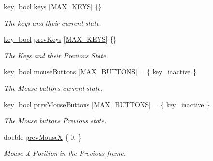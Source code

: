 \begin{DoxyCompactItemize}
\item 
\mbox{\hyperlink{_window_8h_a793ae82d7efec9490f81b4595e03b6f2}{key\+\_\+bool}} \mbox{\hyperlink{class_window_a7e9389c2d0e9f90f10422f86be7d22d8}{keys}} \mbox{[}\mbox{\hyperlink{_window_8h_a3077ecca3770bdee50e6a17dfb55d002}{M\+A\+X\+\_\+\+K\+E\+YS}}\mbox{]} \{\}
\begin{DoxyCompactList}\small\item\em The keys and their current state. \end{DoxyCompactList}\item 
\mbox{\hyperlink{_window_8h_a793ae82d7efec9490f81b4595e03b6f2}{key\+\_\+bool}} \mbox{\hyperlink{class_window_aa0adc9c4e183ccaa355928059359fe9a}{prev\+Keys}} \mbox{[}\mbox{\hyperlink{_window_8h_a3077ecca3770bdee50e6a17dfb55d002}{M\+A\+X\+\_\+\+K\+E\+YS}}\mbox{]} \{\}
\begin{DoxyCompactList}\small\item\em The Keys and their Previous State. \end{DoxyCompactList}\item 
\mbox{\hyperlink{_window_8h_a793ae82d7efec9490f81b4595e03b6f2}{key\+\_\+bool}} \mbox{\hyperlink{class_window_af219ad727d87f6f2d0d34c0d165ec065}{mouse\+Buttons}} \mbox{[}\mbox{\hyperlink{_window_8h_a8bb0c7f312bb8665c3377a061dae552c}{M\+A\+X\+\_\+\+B\+U\+T\+T\+O\+NS}}\mbox{]} = \{ \mbox{\hyperlink{_window_8h_a793ae82d7efec9490f81b4595e03b6f2ab04ef1a66cda34ead7b763a49080d854}{key\+\_\+inactive}} \}
\begin{DoxyCompactList}\small\item\em The Mouse buttons current state. \end{DoxyCompactList}\item 
\mbox{\hyperlink{_window_8h_a793ae82d7efec9490f81b4595e03b6f2}{key\+\_\+bool}} \mbox{\hyperlink{class_window_a89e8b6c9ffa84a095ec76cf1b29b5f94}{prev\+Mouse\+Buttons}} \mbox{[}\mbox{\hyperlink{_window_8h_a8bb0c7f312bb8665c3377a061dae552c}{M\+A\+X\+\_\+\+B\+U\+T\+T\+O\+NS}}\mbox{]} = \{ \mbox{\hyperlink{_window_8h_a793ae82d7efec9490f81b4595e03b6f2ab04ef1a66cda34ead7b763a49080d854}{key\+\_\+inactive}} \}
\begin{DoxyCompactList}\small\item\em The Mouse buttons Previous state. \end{DoxyCompactList}\item 
double \mbox{\hyperlink{class_window_ad50401a5c3c350b562b9577106e60fb0}{prev\+MouseX}} \{ 0. \}
\begin{DoxyCompactList}\small\item\em Mouse X Position in the Previous frame. \end{DoxyCompactList}\item 

\end{DoxyCompactItemize}
